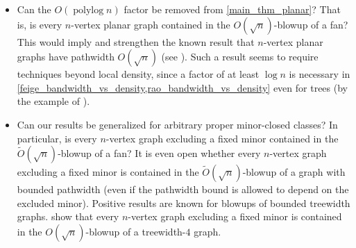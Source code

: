 \documentclass{patmorin}
\DeclareMathOperator{\polylog}{polylog}
\begin{document}
\begin{itemize}
\item Can the $O(\polylog n)$ factor be removed from \cref{main_thm_planar}? That is, is every $n$-vertex planar graph contained in the $O(\sqrt{n})$-blowup of a fan? This would imply and strengthen the known result that $n$-vertex planar graphs have pathwidth $O(\sqrt{n})$ (see \citep{Bodlaender98}). Such a result seems to require techniques beyond local density, since a factor of at least $\log n$ is necessary in
\cref{feige_bandwidth_vs_density,rao_bandwidth_vs_density}  even for trees (by the example of \citet{chvatalova:on}).




\item Can our results be generalized for arbitrary proper minor-closed classes? In particular, is every $n$-vertex  graph excluding a fixed minor contained in the $\tilde{O}(\sqrt{n})$-blowup of a fan? It is even open  whether every $n$-vertex graph excluding a fixed minor is contained in the $\tilde{O}(\sqrt{n})$-blowup of a graph with bounded pathwidth (even if the pathwidth bound is allowed to depend on the excluded minor). Positive results are known for blowups of bounded treewidth graphs. \citet{distel.dujmovic.ea:product} show that every $n$-vertex graph excluding a fixed minor is contained in the $O(\sqrt{n})$-blowup of a treewidth-$4$ graph.
\end{itemize}
\end{document}
